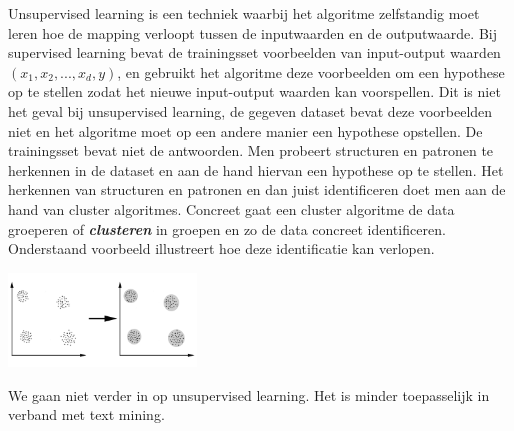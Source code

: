 Unsupervised learning is een techniek waarbij het algoritme zelfstandig moet leren hoe de mapping verloopt tussen de inputwaarden en de outputwaarde. Bij supervised learning bevat de trainingsset voorbeelden van input-output waarden $(x_{1},x_{2},...,x_{d},y)$, en gebruikt het algoritme deze voorbeelden om een hypothese op te stellen zodat het nieuwe input-output waarden kan voorspellen. Dit is niet het geval bij unsupervised learning, de gegeven dataset bevat deze voorbeelden niet en het algoritme moet op een andere manier een hypothese opstellen. De trainingsset bevat niet de antwoorden.
\newline
Men probeert structuren en patronen te herkennen in de dataset en aan de hand hiervan een hypothese op te stellen. Het herkennen van structuren en patronen en dan juist identificeren doet men aan de hand van cluster algoritmes. Concreet gaat een cluster algoritme de data groeperen of \textbf{\textit{clusteren}} in groepen en zo de data concreet identificeren. Onderstaand voorbeeld illustreert hoe deze identificatie kan verlopen.\\
\begin{center}
  \includegraphics[width=5cm]{clustering}
\end{center}
\newline
We gaan niet verder in op unsupervised learning. Het is minder toepasselijk in verband met text mining.
